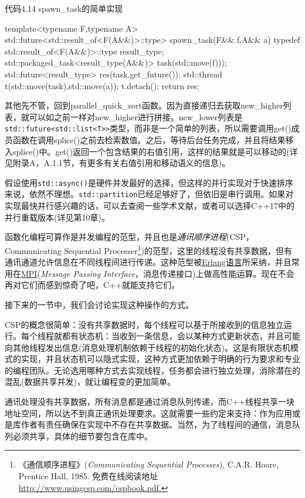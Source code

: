 代码4.14 spawn\_task的简单实现

\begin{cpp}
template<typename F,typename A>
std::future<std::result_of<F(A&&)>::type>
   spawn_task(F&& f,A&& a)
{
  typedef std::result_of<F(A&&)>::type result_type;
  std::packaged_task<result_type(A&&)>
       task(std::move(f)));
  std::future<result_type> res(task.get_future());
  std::thread t(std::move(task),std::move(a));
  t.detach();
  return res;
}
\end{cpp}

其他先不管，回到parallel\_quick\_sort函数。因为直接递归去获取new\_higher列表，就可以如之前一样对new\_higher进行拼接。new\_lower列表是\texttt{std::future<std::list<T>>}类型，而非是一个简单的列表，所以需要调用get()成员函数在调用splice()之前去检索数值。之后，等待后台任务完成，并且将结果移入splice()中。get()返回一个包含结果的右值引用，这样的结果就是可以移动的(详见附录A，A.1.1节，有更多有关右值引用和移动语义的信息)。

假设使用\texttt{std::async()}是硬件并发最好的选择，但这样的并行实现对于快速排序来说，依然不理想。\texttt{std::partition}已经足够好了，但依旧是串行调用。如果对实现最快并行感兴趣的话，可以去查阅一些学术文献，或者可以选择C++17中的并行重载版本(详见第10章)。

函数化编程可算作是并发编程的范型，并且也是\textit{通讯顺序进程}(CSP，Communicating Sequential Processer\footnote[3]{《通信顺序进程》(\textit{Communicating Sequential Processes}), C.A.R. Hoare, Prentice Hall, 1985. 免费在线阅读地址 \url{http://www.usingcsp.com/cspbook.pdf.}})的范型，这里的线程没有共享数据，但有通讯通道允许信息在不同线程间进行传递。这种范型被\href{http://www.erlang.org}{Erlang语言}所采纳，并且常用在\href{http://www.mpi-forum.org}{MPI}(\textit{Message Passing Interface}，消息传递接口)上做高性能运算。现在不会再对它们而感到惊奇了吧，C++就能支持它们。

接下来的一节中，我们会讨论实现这种操作的方式。


CSP的概念很简单：没有共享数据时，每个线程可以基于所接收到的信息独立运行。每个线程就都有状态机：当收到一条信息，会以某种方式更新状态，并且可能向其他线程发出信息(消息处理机制依赖于线程的初始化状态)。这是有限状态机模式的实现，并且状态机可以隐式实现，这种方式更加依赖于明确的行为要求和专业的编程团队。无论选用哪种方式去实现线程，任务都会进行独立处理，消除潜在的混乱(数据共享并发)，就让编程变的更加简单。

通讯处理没有共享数据，所有消息都是通过消息队列传递，而C++线程共享一块地址空间，所以达不到真正通讯处理要求。这就需要一些约定来支持：作为应用或是库作者有责任确保在实现中不存在共享数据。当然，为了线程间的通信，消息队列必须共享，具体的细节要包含在库中。

